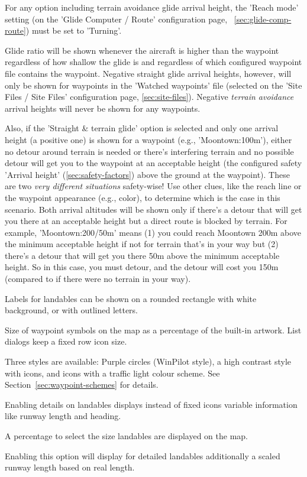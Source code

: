 \begin{description}
  For any option including terrain avoidance glide arrival height, the 'Reach
  mode' setting (on the 'Glide Computer / Route' configuration page,
  ~\ref{sec:glide-comp-route}) must be set to 'Turning'.

  Glide ratio will be shown whenever the aircraft is higher than the waypoint
  regardless of how shallow the glide is and
  regardless of which configured waypoint file contains the waypoint. Negative
  straight glide arrival heights, however, will only be shown for
  waypoints in the 'Watched waypoints' file (selected on the
  'Site Files / Site Files' configuration page, \ref{sec:site-files}). Negative
  \emph{terrain avoidance} arrival heights will never be shown for any waypoints.

  \warning
  Also, if the 'Straight \& terrain glide' option is selected and only one
  arrival height (a positive one) is shown for a waypoint (e.g.,
  'Moontown:100m'), either no detour around terrain is needed or there's
  interfering terrain and no possible detour will get you to the waypoint at
  an acceptable height (the configured safety 'Arrival height'
  (\ref{sec:safety-factors}) above the ground at the waypoint). These are two
  \emph{very different situations} safety-wise!
  Use other clues, like the reach line or the waypoint
  appearance (e.g., color), to determine which is the case in this scenario.
  Both arrival altitudes will be shown only if there's a detour that
  will get you there at an acceptable height but a direct route is blocked
  by terrain.
  For example, 'Moontown:200/50m' means (1) you could reach Moontown 200m above the
  minimum acceptable height if not for terrain that's in your way but (2) there's a detour
  that will get you there 50m above the minimum acceptable height. So in this case,
  you must detour, and the detour will cost you 150m (compared to if there were
  no terrain in your way).

\item[Label style*]  Labels for landables can be shown on a rounded rectangle with
  white background, or with outlined letters.
\item[Waypoint icon size] Size of waypoint symbols on the map as a percentage of
  the built-in artwork. List dialogs keep a fixed row icon size.
\item[Landable symbols]  \label{conf:waypointicons} Three styles are available:
  Purple circles (WinPilot style), a high contrast style with icons,
  and icons with a traffic light colour scheme. See Section~\ref{sec:waypoint-schemes} for details.
\item[Detailed landables*]  Enabling details on landables displays instead of fixed icons 
  variable information like runway length and heading.
\item[Landable size*]  A percentage to select the size landables are displayed on the map.
\item[Scale runway length*]  Enabling this option will display for detailed landables 
  additionally a scaled runway length based on real length.
\end{description}



